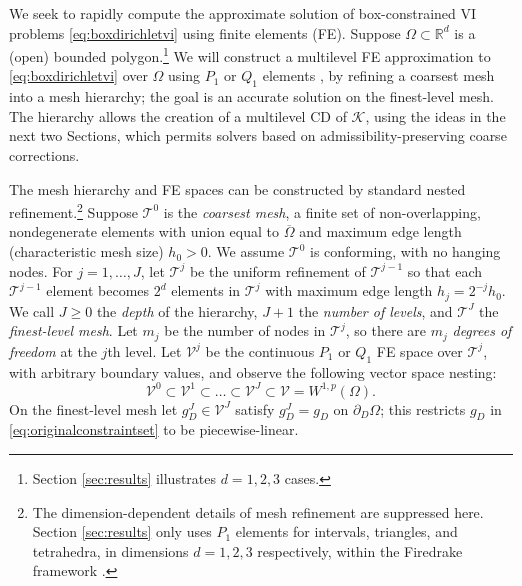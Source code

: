 \documentclass[letterpaper,final,12pt,reqno]{amsart}
\theoremstyle{cstyle}
\theoremstyle{cstyle*}
\theoremstyle{dstyle}
\numberwithin{equation}{section}
\numberwithin{figure}{section}
\numberwithin{table}{section}
\numberwithin{theorem}{section}
\newcommand{\RR}{\mathbb{R}}
\newcommand{\cK}{\mathcal{K}}
\begin{document}
We seek to rapidly compute the approximate solution of box-constrained VI problems \eqref{eq:boxdirichletvi} using finite elements (FE).  Suppose $\Omega \subset \RR^d$ is a (open) bounded polygon.\footnote{Section \ref{sec:results} illustrates $d=1,2,3$ cases.}  We will construct a multilevel FE approximation to \eqref{eq:boxdirichletvi} over $\Omega$ using $P_1$ or $Q_1$ elements \cite{Elmanetal2014}, by refining a coarsest mesh into a mesh hierarchy; the goal is an accurate solution on the finest-level mesh.  The hierarchy allows the creation of a multilevel CD of $\cK$, using the ideas in the next two Sections, which permits solvers based on admissibility-preserving coarse corrections.

The mesh hierarchy and FE spaces can be constructed by standard nested refinement.\footnote{The dimension-dependent details of mesh refinement are suppressed here.  Section \ref{sec:results} only uses $P_1$ elements for intervals, triangles, and tetrahedra, in dimensions $d=1,2,3$ respectively, within the Firedrake framework \cite{Rathgeberetal2016}.}  Suppose $\mathcal{T}^0$ is the \emph{coarsest mesh}, a finite set of non-overlapping, nondegenerate elements with union equal to $\overline{\Omega}$ and maximum edge length (characteristic mesh size) $h_0>0$.  We assume $\mathcal{T}^0$ is conforming, with no hanging nodes.  For $j=1,\dots,J$, let $\mathcal{T}^j$ be the uniform refinement of $\mathcal{T}^{j-1}$ so that each $\mathcal{T}^{j-1}$ element becomes $2^d$ elements in $\mathcal{T}^j$ with maximum edge length $h_j = 2^{-j} h_0$.  We call $J\ge 0$ the \emph{depth} of the hierarchy, $J+1$ the \emph{number of levels}, and $\mathcal{T}^J$ the \emph{finest-level mesh}.  Let $m_j$ be the number of nodes in $\mathcal{T}^j$, so there are $m_j$ \emph{degrees of freedom} at the $j$th level.  Let $\mathcal{V}^j$ be the continuous $P_1$ or $Q_1$ FE space over $\mathcal{T}^j$, with arbitrary boundary values, and observe the following vector space nesting:
\begin{equation}
\mathcal{V}^0 \subset \mathcal{V}^1 \subset \dots \subset \mathcal{V}^J \subset \mathcal{V}=W^{1,p}(\Omega).  \label{eq:fe:nestedspaces}
\end{equation}
On the finest-level mesh let $g_D^J \in \mathcal{V}^J$ satisfy $g_D^J = g_D$ on $\partial_D \Omega$; this restricts $g_D$ in \eqref{eq:originalconstraintset} to be piecewise-linear.
\end{document}
